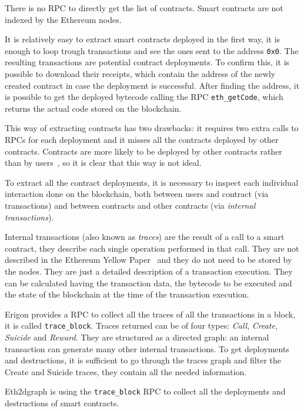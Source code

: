 There is no RPC to directly get the list of contracts. Smart contracts are not indexed by the Ethereum nodes.

It is relatively easy to extract smart contracts deployed in the first way, it is enough to loop trough transactions and see the ones sent to the address \texttt{0x0}. The resulting transactions are potential contract deployments. To confirm this, it is possible to download their receipts, which contain the address of the newly created contract in case the deployment is successful. After finding the address, it is possible to get the deployed bytecode calling the RPC \texttt{eth\_getCode}, which returns the actual code stored on the blockchain.

This way of extracting contracts has two drawbacks: it requires two extra calls to RPCs for each deployment and it misses all the contracts deployed by other contracts. Contracts are more likely to be deployed by other contracts rather than by users~\cite{ethereum-sc-topology}, so it is clear that this way is not ideal.

To extract all the contract deployments, it is necessary to inspect each individual interaction done on the blockchain, both between users and contract (via transactions) and between contracts and other contracts (via \textit{internal transactions}). 

Internal transactions (also known as \textit{traces}) are the result of a call to a smart contract, they describe each single operation performed in that call. They are not described in the Ethereum Yellow Paper~\cite{ethereum-yellow} and they do not need to be stored by the nodes. They are just a detailed description of a transaction execution. They can be calculated having the transaction data, the bytecode to be executed and the state of the blockchain at the time of the transaction execution. 

Erigon provides a RPC to collect all the traces of all the transactions in a block, it is called \texttt{trace\_block}. Traces returned can be of four types: \textit{Call}, \textit{Create}, \textit{Suicide} and \textit{Reward}. They are structured as a directed graph: an internal transaction can generate many other internal transactions. To get deployments and destructions, it is sufficient to go through the traces graph and filter the Create and Suicide traces, they contain all the needed information.

Eth2dgraph is using the \texttt{trace\_block} RPC to collect all the deployments and destructions of smart contracts.

